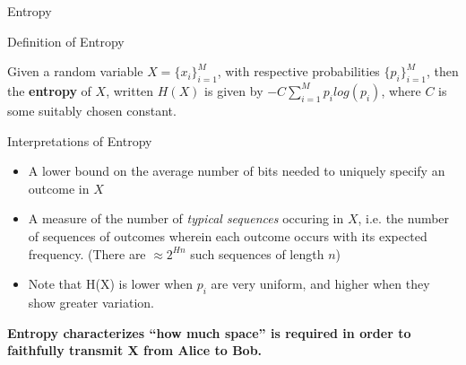 \documentclass{beamer}
\begin{document}
\begin{frame}{Entropy}

\begin{structure}{Definition of Entropy}

 Given a random variable $X = \{x_i\}_{i=1}^{M}$, with respective probabilities
 $\{p_i\}_{i=1}^{M}$, then the \textbf{entropy} of $X$, written $H(X)$
 is given by
 $-C\sum_{i=1}^{M}{p_i log(p_i)}$, where $C$ is some suitably chosen constant.

\end{structure}

\bigskip


\begin{structure}{Interpretations of Entropy}
\begin{itemize}

 \item{A lower bound on the average number of bits needed to uniquely
       specify an outcome in $X$}

 \item{A measure of the number of \emph{typical sequences} occuring in $X$,
       i.e. the number of sequences of outcomes wherein each outcome occurs
       with its expected frequency. (There are $\approx 2^{Hn}$ such sequences
       of length $n$)}

 \item{Note that H(X) is lower when $p_i$ are very uniform, and higher when
       they show greater variation.}

\end{itemize}
\end{structure}

\textbf{Entropy characterizes ``how much space''
is required in order to faithfully transmit X from Alice to Bob.}

\end{frame}
\end{document}
